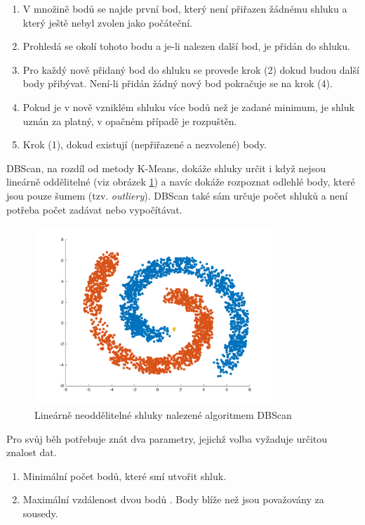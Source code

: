 \documentclass[pdftex,a4paper]{article}
\begin{document}
\begin{enumerate}
	\item V množině bodů se najde první bod, který není přiřazen žádnému shluku a který ještě nebyl zvolen jako počáteční.
	\item Prohledá se \textepsilon{} okolí tohoto bodu a je-li nalezen další bod, je přidán do shluku.
	\item Pro každý nově přidaný bod do shluku se provede krok (2) dokud budou další body přibývat. Není-li přidán žádný nový bod pokračuje se na krok (4).
	\item Pokud je v nově vzniklém shluku více bodů než je zadané minimum, je shluk uznán za platný, v opačném případě je rozpuštěn. 
	\item Krok (1), dokud existují  (nepřiřazené a nezvolené) body.
\end{enumerate}

DBScan, na rozdíl od metody K-Means, dokáže shluky určit i když nejsou lineárně oddělitelné (viz obrázek \ref{fig:obr2}) a navíc dokáže rozpoznat odlehlé body, které jsou pouze šumem (tzv. \textit{outliery}). DBScan také sám určuje počet shluků a není potřeba počet zadávat nebo vypočítávat.

\begin{figure}[h]
	\centering
	\includegraphics[width=0.8\textwidth]{res/dbscan.png}
	\caption{Lineárně neoddělitelné shluky nalezené algoritmem DBScan}
	\label{fig:obr2}
\end{figure}

\vspace{\baselineskip}

Pro svůj běh potřebuje znát dva parametry, jejichž volba vyžaduje určitou znalost dat.

\begin{enumerate}
	\item Minimální počet bodů, které smí utvořit shluk.
	\item Maximální vzdálenost dvou bodů \textepsilon. Body blíže než \textepsilon{} jsou považovány za sousedy.
\end{enumerate}
\end{document}
